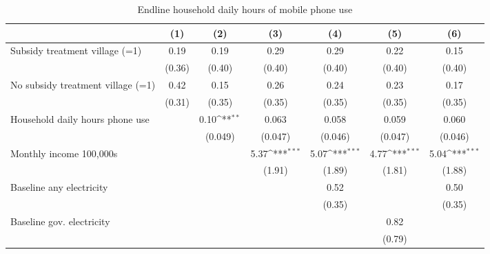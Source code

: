 \begin{table}[htbp]\centering
\def\sym#1{\ifmmode^{#1}\else\(^{#1}\)\fi}
\caption{Endline household daily hours of mobile phone use}
\begin{tabular*}{1\hsize}{@{\hskip\tabcolsep\extracolsep\fill}l*{6}{c}}
\toprule
                &\multicolumn{1}{c}{(1)}         &\multicolumn{1}{c}{(2)}         &\multicolumn{1}{c}{(3)}         &\multicolumn{1}{c}{(4)}         &\multicolumn{1}{c}{(5)}         &\multicolumn{1}{c}{(6)}         \\
\midrule
Subsidy treatment village (=1)&     0.19         &     0.19         &     0.29         &     0.29         &     0.22         &     0.15         \\
                &   (0.36)         &   (0.40)         &   (0.40)         &   (0.40)         &   (0.40)         &   (0.40)         \\
No subsidy treatment village (=1)&     0.42         &     0.15         &     0.26         &     0.24         &     0.23         &     0.17         \\
                &   (0.31)         &   (0.35)         &   (0.35)         &   (0.35)         &   (0.35)         &   (0.35)         \\
Household daily hours phone use&                  &     0.10\sym{**} &    0.063         &    0.058         &    0.059         &    0.060         \\
                &                  &  (0.049)         &  (0.047)         &  (0.046)         &  (0.047)         &  (0.046)         \\
Monthly income 100,000s&                  &                  &     5.37\sym{***}&     5.07\sym{***}&     4.77\sym{***}&     5.04\sym{***}\\
                &                  &                  &   (1.91)         &   (1.89)         &   (1.81)         &   (1.88)         \\
Baseline any electricity&                  &                  &                  &     0.52         &                  &     0.50         \\
                &                  &                  &                  &   (0.35)         &                  &   (0.35)         \\
Baseline gov. electricity&                  &                  &                  &                  &     0.82         &                  \\
                &                  &                  &                  &                  &   (0.79)         &                  \\

\end{tabular*}
\end{table}
